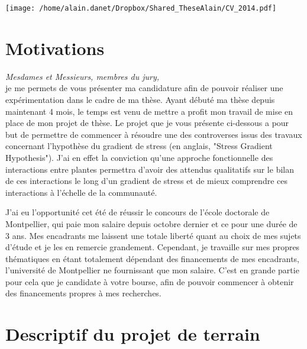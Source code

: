 \documentclass[12pt]{article} %
\begin{document}


\begin{center}
\texttt{[image: /home/alain.danet/Dropbox/Shared\_TheseAlain/CV\_2014.pdf]}
\end{center}

\section{Motivations}

\emph{Mesdames et Messieurs, membres du jury,}\\
je me permets de vous présenter ma candidature afin de pouvoir réaliser une expérimentation dans le cadre de ma thèse. Ayant débuté ma thèse depuis maintenant 4 mois, le temps est venu de mettre a profit mon travail de mise en place de mon projet de thèse. Le projet que je vous présente ci-dessous a pour but de permettre de commencer à résoudre une des controverses issus des travaux concernant l'hypothèse du gradient de stress (en anglais, "Stress Gradient Hypothesis"). J'ai en effet la conviction qu'une approche fonctionnelle des interactions entre plantes permettra d'avoir des attendus qualitatifs sur le bilan de ces interactions le long d'un gradient de stress et de mieux comprendre ces interactions à l'échelle de la communauté.

J'ai eu l'opportunité cet été de réussir le concours de l'école doctorale de Montpellier, qui paie mon salaire depuis octobre dernier et ce pour une durée de 3 ans. Mes encadrants me laissent une totale liberté quant au choix de mes sujets d'étude et je les en remercie grandement. Cependant, je travaille sur mes propres thématiques en étant totalement dépendant des financements de mes encadrants, l'université de Montpellier ne fournissant que mon salaire. C'est en grande partie pour cela que je candidate à votre bourse, afin de pouvoir commencer à obtenir des financements propres à mes recherches.

\clearpage

\section{Descriptif du projet de terrain}
\end{document}
